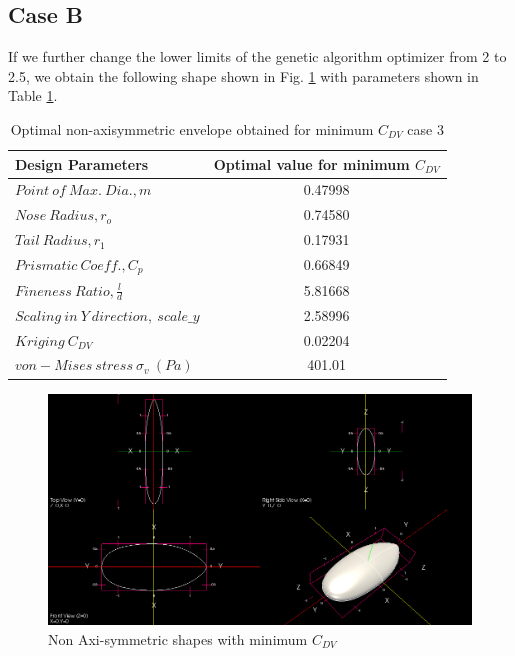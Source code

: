\subsection*{Case B}
If we further change the lower limits of the genetic algorithm optimizer from 2 to 2.5, we obtain the following shape shown in Fig. \ref{Optimal min cdv} with parameters shown in Table \ref{Optimal non-axisymmetric body obtained for mimimum Cdv}.

\begin{table}[H]
	\centering
	\caption{Optimal non-axisymmetric envelope obtained for minimum $ C_{DV} $ case 3}
	\label{Optimal non-axisymmetric body obtained for mimimum Cdv}
	\begin{tabular}{lc}
		\hline \hline
		Design Parameters & Optimal value for minimum $ C_{DV} $    \\ \hline \hline
		$ Point\ of\ Max.\ Dia., m$ & 0.47998      \\  
		$ Nose\ Radius, r _{o} $ & 0.74580    \\
		$ Tail\ Radius, r _{1} $ & 0.17931     \\  
		$ Prismatic\ Coeff., C _{p }$ & 0.66849 \\
		$ Fineness\ Ratio, \frac{l}{d} $ & 5.81668 \\
		$Scaling\ in\ Y\ direction,\ scale\_y$ & 2.58996 \\ \hline \hline
		
		
		$ Kriging\ C_{DV} $ & 0.02204 \\
		$ von-Mises\ stress\  \sigma _{v} \ (Pa) $ & 401.01 \\
		
		\hline \hline
	\end{tabular}
\end{table}

\begin{figure}[H]
	\centering
	\includegraphics[width=450 pt]{rnd/min_cdv_case3.png}
	\caption{Non Axi-symmetric shapes with minimum $ C_{DV}$}
	\label{Optimal min cdv} %
\end{figure}

